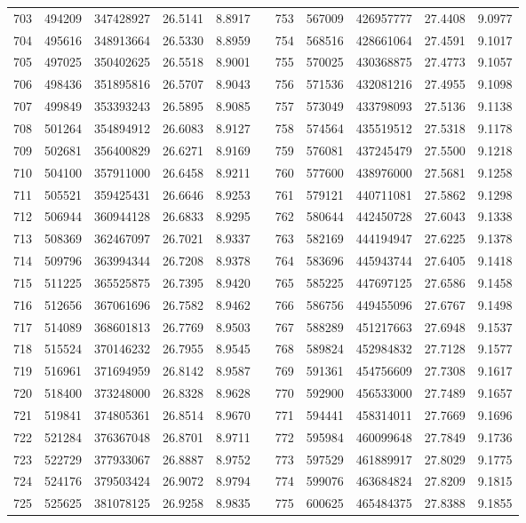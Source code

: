 \begin{longtable}{rrrrrrrrrrr}
703&494209&347428927&26.5141&8.8917&&753&567009&426957777&27.4408&9.0977\\
704&495616&348913664&26.5330&8.8959&&754&568516&428661064&27.4591&9.1017\\
705&497025&350402625&26.5518&8.9001&&755&570025&430368875&27.4773&9.1057\\
706&498436&351895816&26.5707&8.9043&&756&571536&432081216&27.4955&9.1098\\
707&499849&353393243&26.5895&8.9085&&757&573049&433798093&27.5136&9.1138\\
708&501264&354894912&26.6083&8.9127&&758&574564&435519512&27.5318&9.1178\\
709&502681&356400829&26.6271&8.9169&&759&576081&437245479&27.5500&9.1218\\
710&504100&357911000&26.6458&8.9211&&760&577600&438976000&27.5681&9.1258\\
711&505521&359425431&26.6646&8.9253&&761&579121&440711081&27.5862&9.1298\\
712&506944&360944128&26.6833&8.9295&&762&580644&442450728&27.6043&9.1338\\
713&508369&362467097&26.7021&8.9337&&763&582169&444194947&27.6225&9.1378\\
714&509796&363994344&26.7208&8.9378&&764&583696&445943744&27.6405&9.1418\\
715&511225&365525875&26.7395&8.9420&&765&585225&447697125&27.6586&9.1458\\
716&512656&367061696&26.7582&8.9462&&766&586756&449455096&27.6767&9.1498\\
717&514089&368601813&26.7769&8.9503&&767&588289&451217663&27.6948&9.1537\\
718&515524&370146232&26.7955&8.9545&&768&589824&452984832&27.7128&9.1577\\
719&516961&371694959&26.8142&8.9587&&769&591361&454756609&27.7308&9.1617\\
720&518400&373248000&26.8328&8.9628&&770&592900&456533000&27.7489&9.1657\\
721&519841&374805361&26.8514&8.9670&&771&594441&458314011&27.7669&9.1696\\
722&521284&376367048&26.8701&8.9711&&772&595984&460099648&27.7849&9.1736\\
723&522729&377933067&26.8887&8.9752&&773&597529&461889917&27.8029&9.1775\\
724&524176&379503424&26.9072&8.9794&&774&599076&463684824&27.8209&9.1815\\
725&525625&381078125&26.9258&8.9835&&775&600625&465484375&27.8388&9.1855\\

\end{longtable}
